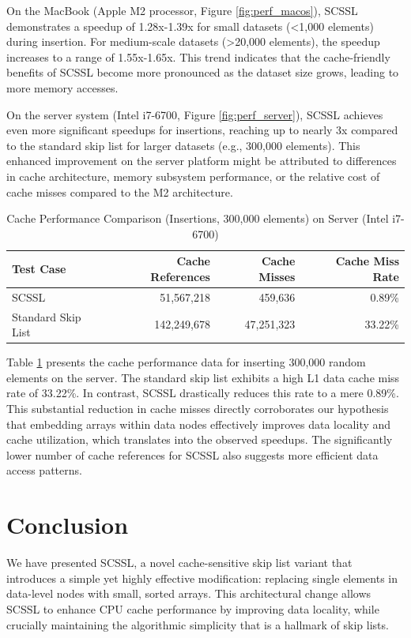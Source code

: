 \documentclass{article}
\begin{document}
On the MacBook (Apple M2 processor, Figure \ref{fig:perf_macos}), SCSSL demonstrates a speedup of 1.28x-1.39x for small datasets (<1,000 elements) during insertion. For medium-scale datasets (>20,000 elements), the speedup increases to a range of 1.55x-1.65x. This trend indicates that the cache-friendly benefits of SCSSL become more pronounced as the dataset size grows, leading to more memory accesses.

On the server system (Intel i7-6700, Figure \ref{fig:perf_server}), SCSSL achieves even more significant speedups for insertions, reaching up to nearly 3x compared to the standard skip list for larger datasets (e.g., 300,000 elements). This enhanced improvement on the server platform might be attributed to differences in cache architecture, memory subsystem performance, or the relative cost of cache misses compared to the M2 architecture.

\begin{table}[htbp]
\centering
\caption{Cache Performance Comparison (Insertions, 300,000 elements) on Server (Intel i7-6700)}
\label{tab:cache_performance}
\begin{tabular}{@{}lrrr@{}}
\toprule
Test Case & Cache References & Cache Misses & Cache Miss Rate \\
\midrule
SCSSL & 51,567,218 & 459,636 & 0.89\% \\
Standard Skip List & 142,249,678 & 47,251,323 & 33.22\% \\
\bottomrule
\end{tabular}
\end{table}

Table \ref{tab:cache_performance} presents the cache performance data for inserting 300,000 random elements on the server. The standard skip list exhibits a high L1 data cache miss rate of 33.22\%. In contrast, SCSSL drastically reduces this rate to a mere 0.89\%. This substantial reduction in cache misses directly corroborates our hypothesis that embedding arrays within data nodes effectively improves data locality and cache utilization, which translates into the observed speedups. The significantly lower number of cache references for SCSSL also suggests more efficient data access patterns.

\section{Conclusion}
\label{sec:conclusion}

We have presented SCSSL, a novel cache-sensitive skip list variant that introduces a simple yet highly effective modification: replacing single elements in data-level nodes with small, sorted arrays. This architectural change allows SCSSL to enhance CPU cache performance by improving data locality, while crucially maintaining the algorithmic simplicity that is a hallmark of skip lists.
\end{document}
